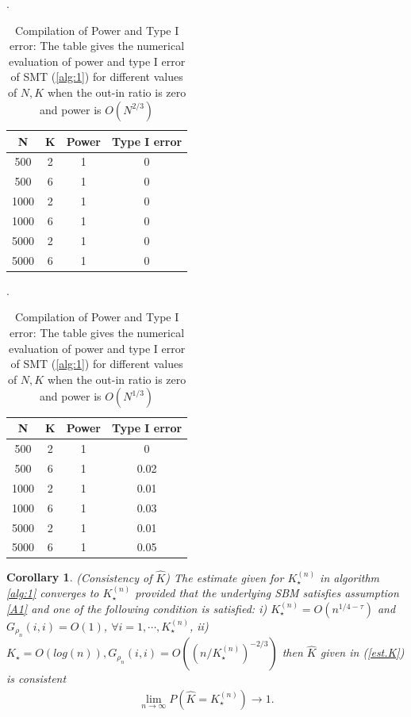 \documentclass[11pt]{article}
\newtheorem{corollary}[theorem]{Corollary}
\newcommand{\be}{\begin{eqnarray}}
\newcommand{\ee}{\end{eqnarray}}
\begin{document}
\begin{table}[H]
\centering
\caption{Compilation of Power and Type I error: The table gives the numerical evaluation of power and type I error of SMT (\ref{alg:1}) for different values of $N,K$ when the out-in ratio is zero and power is $O(N^{2/3})$}\label{T1}.
\begin{tabular}{|c| c | c | c|}
\hline
N & K & Power & Type I error \\
\hline
500 & 2 & 1 & 0 \\
500 & 6 & 1 & 0 \\
\hline
1000 & 2 & 1 & 0 \\
1000 & 6 & 1 & 0 \\
\hline
5000 & 2 & 1 & 0 \\
5000 & 6 & 1 & 0\\
\hline
\end{tabular}
\end{table}

\begin{table}[H]
\centering
\caption{Compilation of Power and Type I error: The table gives the numerical evaluation of power and type I error of SMT (\ref{alg:1}) for different values of $N,K$ when the out-in ratio is zero and power is $O(N^{1/3})$}\label{T2}.
\begin{tabular}{|c| c | c | c|}
\hline
N & K & Power & Type I error \\
\hline
500 & 2 & 1 & 0 \\
500 & 6 & 1 & 0.02 \\
\hline
1000 & 2 & 1 & 0.01 \\
1000 & 6 & 1 & 0.03 \\
\hline
5000 & 2 & 1 & 0.01 \\
5000 & 6 & 1 & 0.05\\
\hline
\end{tabular}
\end{table}

\begin{corollary}\label{hatk}
    (Consistency of $\hat{K}$) The estimate given for $K_{\star}^{(n)}$ in algorithm \ref{alg:1} converges to $K_{\star}^{(n)}$ provided that the underlying SBM satisfies assumption \ref{A1} and one of the following condition is satisfied: i) $K_{\star}^{(n)} = O(n^{1/4 - \tau})$ and $G_{\rho_n}(i,i) = O(1)$, $\forall i=1, \cdots, K_{\star}^{(n)}$, ii) $K_{\star} = O(log(n)), G_{\rho_n}(i,i) = O( (n/K_{\star}^{(n)})^{-2/3})$ then $\hat{K}$ given in (\ref{est.K}) is consistent
    \be\label{hatk}
     \lim_{n \to \infty}   P(\hat{K} = K_{\star}^{(n)}) \to 1.
    \ee
\end{corollary}
\end{document}
